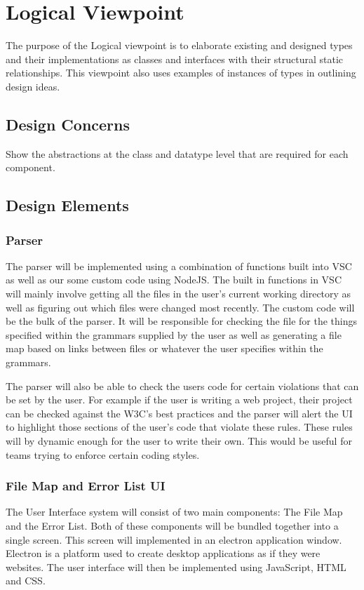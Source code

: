 \documentclass[letterpaper,10pt,titlepage,draftclsnofoot,onecolumn,onesided] {IEEEtran}
\begin{document}
	
	
\section{Logical Viewpoint}
The purpose of the Logical viewpoint is to elaborate existing and designed types and their implementations
as classes and interfaces with their structural static relationships. This viewpoint also uses examples of
instances of types in outlining design ideas. 
\subsection{Design Concerns}
Show the abstractions at the class and datatype level that are required for each component. 
\subsection{Design Elements}


	\subsubsection{Parser}
	
	The parser will be implemented using a combination of functions built into VSC as well as our some custom code using NodeJS.
	The built in functions in VSC will mainly involve getting all the files in the user's current working directory as well as figuring out which files were changed most recently.
	The custom code will be the bulk of the parser.
	It will be responsible for checking the file for the things specified within the grammars supplied by the user as well as generating a file map based on links between files or whatever the user specifies within the grammars.
	
	The parser will also be able to check the users code for certain violations that can be set by the user.
	For example if the user is writing a web project, their project can be checked against the W3C's best practices and the parser will alert the UI to highlight those sections of the user's code that violate these rules.
	These rules will by dynamic enough for the user to write their own.
	This would be useful for teams trying to enforce certain coding styles.\cite{w3c}
	

	\subsubsection{File Map and Error List UI}
	The User Interface system will consist of two main components: The File Map and the Error List. 
	Both of these components will be bundled together into a single screen. 
	This screen will implemented in an electron application window. 
	Electron is a platform used to create desktop applications as if they were websites. \cite{Electron}
	The user interface will then be implemented using JavaScript, HTML and CSS.
	
\end{document}
